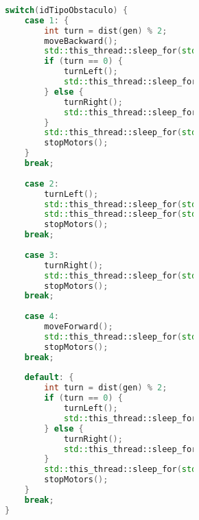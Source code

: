 \begin{lstlisting}[language={C++}, caption={Quinto ajuste de c\'odigo}, label={QuintoAjuste}]
                                
                                switch(idTipoObstaculo) {
                                    case 1: {
                                        int turn = dist(gen) % 2;
                                        moveBackward();
                                        std::this_thread::sleep_for(std::chrono::seconds(5));
                                        if (turn == 0) {
                                            turnLeft();
                                            std::this_thread::sleep_for(std::chrono::seconds(5));
                                        } else {
                                            turnRight();
                                            std::this_thread::sleep_for(std::chrono::seconds(5));
                                        }
                                        std::this_thread::sleep_for(std::chrono::seconds(2));
                                        stopMotors();
                                    }
                                    break;
                                    
                                    case 2:
                                        turnLeft();
                                        std::this_thread::sleep_for(std::chrono::seconds(5));
                                        std::this_thread::sleep_for(std::chrono::seconds(2));
                                        stopMotors();
                                    break;
                                    
                                    case 3:
                                        turnRight();
                                        std::this_thread::sleep_for(std::chrono::seconds(7));
                                        stopMotors();
                                    break;
                                    
                                    case 4:
                                        moveForward();
                                        std::this_thread::sleep_for(std::chrono::seconds(2));
                                        stopMotors();
                                    break;
                                    
                                    default: {
                                        int turn = dist(gen) % 2;
                                        if (turn == 0) {
                                            turnLeft();
                                            std::this_thread::sleep_for(std::chrono::seconds(5));
                                        } else {
                                            turnRight();
                                            std::this_thread::sleep_for(std::chrono::seconds(5));
                                        }
                                        std::this_thread::sleep_for(std::chrono::seconds(2));
                                        stopMotors();
                                    }
                                    break;
                                }
        

\end{lstlisting}
